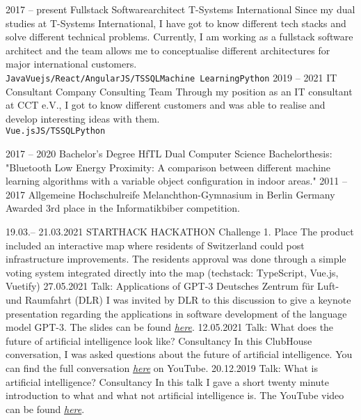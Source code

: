 \documentclass[9pt]{cvstyle}
\begin{document}

\begin{entrylist}
	\entry
		{2017 -- present}
		{Fullstack Softwarearchitect}
		{T-Systems International}
		{
			Since my dual studies at T-Systems International, I have got to know different tech stacks and solve different
			technical problems. Currently, I am working as a fullstack software architect and the team allows me to
			conceptualise different architectures for major international customers.\\
			\texttt{Java}\slashsep\texttt{Vuejs/React/Angular}\slashsep\texttt{JS/TS}\slashsep\texttt{SQL}\slashsep\texttt{Machine Learning}\slashsep\texttt{Python}
		}
	\entry
		{2019 -- 2021}
		{IT Consultant}
		{Company Consulting Team}
		{
			Through my position as an IT consultant at CCT e.V., I got to know different customers and was able to realise
			and develop interesting ideas with them.\\
			\texttt{Vue.js}\slashsep\texttt{JS/TS}\slashsep\texttt{SQL}\slashsep\texttt{Python}
		}
\end{entrylist}


\begin{entrylist}
	\entry
		{2017 -- 2020}
		{Bachelor's Degree}
		{HfTL Dual Computer Science}
		{Bachelorthesis: "Bluetooth Low Energy Proximity: A comparison between different machine learning algorithms with a variable object configuration in indoor areas."}
	\entry
		{2011 -- 2017}
		{Allgemeine Hochschulreife}
		{Melanchthon-Gymnasium in Berlin Germany}
		{Awarded 3rd place in the Informatikbiber competition.}
\end{entrylist}


\begin{entrylist}
	\entry
		{19.03.-- 21.03.2021}
		{STARTHACK HACKATHON}
		{Challenge 1. Place}
		{The product included an interactive map where residents of Switzerland could post infrastructure improvements. The residents approval was done through a simple voting system integrated directly into the map (techstack: TypeScript, Vue.js, Vuetify)}
	\entry
		{27.05.2021}
		{Talk: Applications of GPT-3}
		{Deutsches Zentrum für Luft- und Raumfahrt (DLR)}
		{I was invited by DLR to this discussion to give a keynote presentation regarding the applications in software development of the language model GPT-3. The slides can be found \emph{\href{https://florianwoelki-dlr-slides.vercel.app}{here}}.}
	\entry
		{12.05.2021}
		{Talk: What does the future of artificial intelligence look like?}
		{Consultancy}
		{In this ClubHouse conversation, I was asked questions about the future of artificial intelligence. You can find the full conversation \emph{\href{https://youtu.be/cZ--7TzyzfM}{here}} on YouTube.}
	\entry
		{20.12.2019}
		{Talk: What is artificial intelligence?}
		{Consultancy}
		{In this talk I gave a short twenty minute introduction to what and what not artificial intelligence is. The YouTube video can be found \emph{\href{https://www.youtube.com/watch?v=m9kapfxwYOA&feature=youtu.be}{here}}.}
\end{entrylist}
\end{document}
